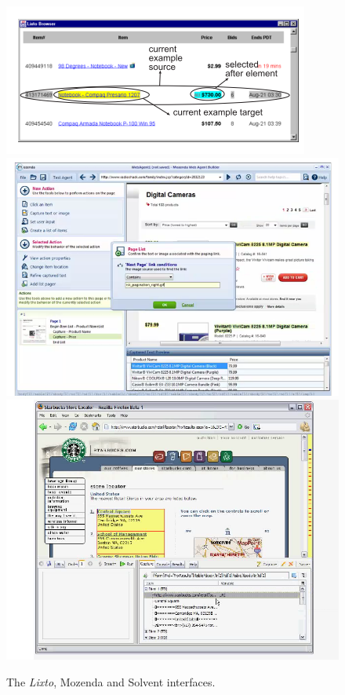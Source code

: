 \begin{figure}[htbp]
\begin{center}
\includegraphics[scale=0.5]{lixto.png} 
\includegraphics[scale=0.25]{mozenda.png}
\\
\includegraphics[scale=0.25]{piggybank.png} 
\end{center}

\caption{The \textit{Lixto}, Mozenda and Solvent interfaces.}
\label{fig:lixto}
\end{figure}

